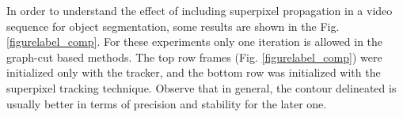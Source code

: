 In order to understand the effect of including superpixel propagation in a video sequence for object
segmentation, some results are shown in the Fig. \ref{figurelabel_comp}. For these experiments only one iteration is
allowed in the graph-cut based methods. The top row frames (Fig. \ref{figurelabel_comp}) were initialized only with the tracker, 
and the bottom row was initialized with the superpixel tracking technique. 
Observe that in general, the contour delineated is usually better in terms of precision and
stability for the later one.
